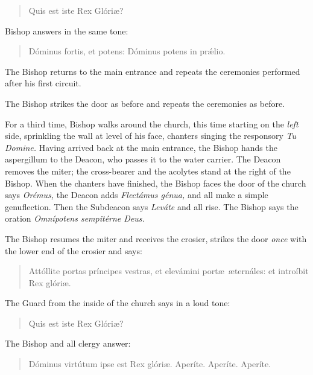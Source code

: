 \documentclass[letterpaper]{report}
\begin{document}
{    \begin{quote}
       Quis est iste Rex Glóri\ae? 
    \end{quote}

    Bishop answers in the same tone:

    \begin{quote}
        Dóminus fortis, et potens: Dóminus potens in pr\'\ae lio.
    \end{quote}

    \rubric The Bishop returns to the main entrance and repeats the ceremonies performed
    after his first circuit.

    \rubric The Bishop strikes the door as before and repeats the ceremonies as before.

    \rubric For a third time, Bishop walks around the church, this time
    starting on the \textit{left} side, sprinkling the wall at level of his
    face, chanters singing the responsory \textit{Tu Domine.} Having arrived
    back at the main entrance, the Bishop hands the aspergillum to the Deacon,
    who passes it to the water carrier. The Deacon removes the miter; the
    cross-bearer and the acolytes stand at the right of the Bishop. When the
    chanters have finished, the Bishop faces the door of the church says
    \textit{Orémus,} the Deacon adds \textit{Flectámus génua,} and all make a
    simple genuflection. Then the Subdeacon says \textit{Leváte} and all rise.
    The Bishop says the oration \textit{Omnípotens sempitérne Deus.}

    \rubric The Bishop resumes the miter and receives the crosier, strikes the
    door \textit{once} with the lower end of the crosier and says:

    \begin{quote}
        Attóllite portas príncipes vestras, et elevámini port\ae\ \ae ternáles: et
        introíbit Rex glóri\ae.
    \end{quote}

    The Guard from the inside of the church says in a loud tone:

    \begin{quote}
       Quis est iste Rex Glóri\ae? 
    \end{quote}

    The Bishop and all clergy answer:

    \begin{quote}
        Dóminus virtútum ipse est Rex glóri\ae. Aperíte. Aperíte. Aperíte.
    \end{quote}

}
\end{document}
